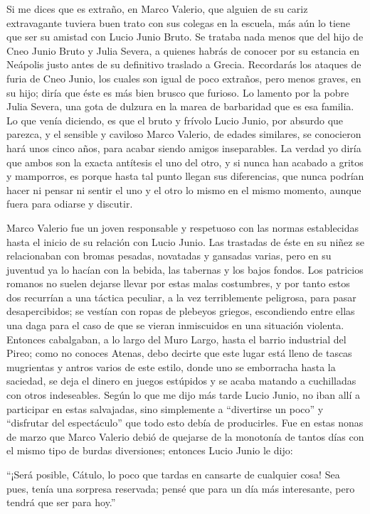 \documentclass[11pt,openany]{book}
\begin{document}
Si me dices que es extraño, en Marco Valerio, que alguien de su cariz extravagante tuviera buen trato con sus colegas en la escuela, más aún lo tiene que ser su amistad con Lucio Junio Bruto. Se trataba nada menos que del hijo de Cneo Junio Bruto y Julia Severa, a quienes habrás de conocer por su estancia en Neápolis justo antes de su definitivo traslado a Grecia. Recordarás los ataques de furia de Cneo Junio, los cuales son igual de poco extraños, pero menos graves, en su hijo; diría que éste es más bien brusco que furioso. Lo lamento por la pobre Julia Severa, una gota de dulzura en la marea de barbaridad que es esa familia. Lo que venía diciendo, es que el bruto y frívolo Lucio Junio, por absurdo que parezca, y el sensible y caviloso Marco Valerio, de edades similares, se conocieron hará unos cinco años, para acabar siendo amigos inseparables. La verdad yo diría que ambos son la exacta antítesis el uno del otro, y si nunca han acabado a gritos y mamporros, es porque hasta tal punto llegan sus diferencias, que nunca podrían hacer ni pensar ni sentir el uno y el otro lo mismo en el mismo momento, aunque fuera para odiarse y discutir.

Marco Valerio fue un joven responsable y respetuoso con las normas establecidas hasta el inicio de su relación con Lucio Junio. Las trastadas de éste en su niñez se relacionaban con bromas pesadas, novatadas y gansadas varias, pero en su juventud ya lo hacían con la bebida, las tabernas y los bajos fondos. Los patricios romanos no suelen dejarse llevar por estas malas costumbres, y por tanto estos dos recurrían a una táctica peculiar, a la vez terriblemente peligrosa, para pasar desapercibidos; se vestían con ropas de plebeyos griegos, escondiendo entre ellas una daga para el caso de que se vieran inmiscuidos en una situación violenta. Entonces cabalgaban, a lo largo del Muro Largo, hasta el barrio industrial del Pireo; como no conoces Atenas, debo decirte que este lugar está lleno de tascas mugrientas y antros varios de este estilo, donde uno se emborracha hasta la saciedad, se deja el dinero en juegos estúpidos y se acaba matando a cuchilladas con otros indeseables. Según lo que me dijo más tarde Lucio Junio, no iban allí a participar en estas salvajadas, sino simplemente a “divertirse un poco” y  “disfrutar del espectáculo” que todo esto debía de producirles. Fue en estas nonas de marzo que Marco Valerio debió de quejarse de la monotonía de tantos días con el mismo tipo de burdas diversiones; entonces Lucio Junio le dijo: 

“¡Será posible, Cátulo, lo poco que tardas en cansarte de cualquier cosa! Sea pues, tenía una sorpresa reservada; pensé que para un día más interesante, pero tendrá que ser para hoy.” 
\end{document}
